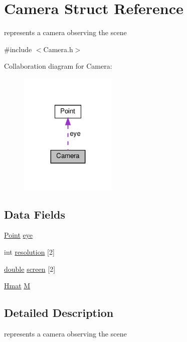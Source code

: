 \hypertarget{struct_camera}{}\section{Camera Struct Reference}
\label{struct_camera}


represents a camera observing the scene  




{\ttfamily \#include $<$Camera.\+h$>$}



Collaboration diagram for Camera\+:\nopagebreak
\begin{figure}[H]
\begin{center}
\leavevmode
\includegraphics[width=131pt]{struct_camera__coll__graph}
\end{center}
\end{figure}
\subsection*{Data Fields}
\begin{DoxyCompactItemize}
\item 
\hyperlink{struct_point}{Point} \hyperlink{struct_camera_a3f0f7501902ff66889e21c369d1159d0}{eye}
\item 
int \hyperlink{struct_camera_a5496c6b1391a3368a05f6b7a44cc2aa0}{resolution} \mbox{[}2\mbox{]}
\item 
\hyperlink{g3x__transfo_8h_a89b2b23e407882a535d835574a7912e1}{double} \hyperlink{struct_camera_aad384fcdec994533787d54acd096c5cb}{screen} \mbox{[}2\mbox{]}
\item 
\hyperlink{_hmat_8h_a7263a9d077d77f58425e01446b766c9f}{Hmat} \hyperlink{struct_camera_a94d9bf45fca18b32481a1bbd1ea58bdf}{M}
\end{DoxyCompactItemize}


\subsection{Detailed Description}
represents a camera observing the scene 

